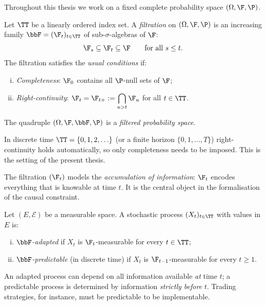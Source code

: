 Throughout this thesis we work on a fixed complete probability space
$(\Omega,\F,\P)$.

\begin{definition}
\label{def:filtration}
Let $\TT$ be a linearly ordered index set.  A \emph{filtration} on
$(\Omega,\F,\P)$ is an increasing family
$\bbF=(\F_t)_{t\in\TT}$ of sub-$\sigma$-algebras of $\F$:
\[
  \F_s \subseteq \F_t \subseteq \F
  \qquad \text{for all } s \le t.
\]
The filtration satisfies the \emph{usual conditions} if:
\begin{enumerate}[(i)]
  \item \emph{Completeness}: $\F_0$ contains all $\P$-null sets of $\F$;
  \item \emph{Right-continuity}:
        $\displaystyle\F_t = \F_{t+} := \bigcap_{u>t}\F_u$
        for all $t\in\TT$.
\end{enumerate}
The quadruple $(\Omega,\F,\bbF,\P)$ is a \emph{filtered probability space}.
\end{definition}

\begin{remark}
In discrete time $\TT=\{0,1,2,\ldots\}$ (or a finite horizon
$\{0,1,\ldots,T\}$) right-continuity holds automatically, so only
completeness needs to be imposed.  This is the setting of the present thesis.
\end{remark}

The filtration $(\F_t)$ models the \emph{accumulation of information}:
$\F_t$ encodes everything that is knowable at time $t$.  It is the
central object in the formalisation of the causal constraint.

\begin{definition}
\label{def:adapted}
Let $(E,\mathcal{E})$ be a measurable space.
A stochastic process $(X_t)_{t\in\TT}$ with values in $E$ is:
\begin{enumerate}[(i)]
  \item \emph{$\bbF$-adapted} if $X_t$ is $\F_t$-measurable for every
        $t\in\TT$;
  \item \emph{$\bbF$-predictable} (in discrete time) if $X_t$ is
        $\F_{t-1}$-measurable for every $t\ge 1$.
\end{enumerate}
\end{definition}

An adapted process can depend on all information available \emph{at} time $t$;
a predictable process is determined by information \emph{strictly before} $t$.
Trading strategies, for instance, must be predictable to be implementable.

